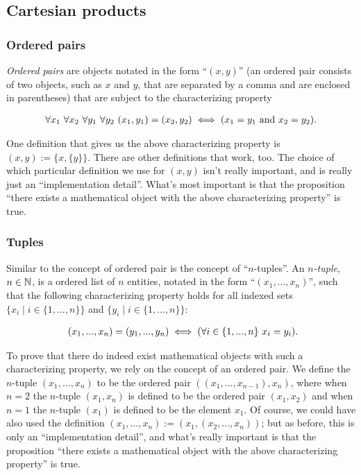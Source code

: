 \subsection*{Cartesian products}

\subsubsection*{Ordered pairs}

\textit{Ordered pairs} are objects notated in the form ``$(x, y)$'' (an ordered pair consists of two objects, such as $x$ and $y$, that are separated by a comma and are enclosed in parentheses) that are subject to the characterizing property

\begin{align*}
    \forall x_1 \text{ } \forall x_2 \text{ } \forall y_1 \text{ } \forall y_2 \text{ } (x_1, y_1) = (x_2, y_2) \iff (x_1 = y_1 \text{ and } x_2 = y_2).
\end{align*}

One definition that gives us the above characterizing property is $(x, y) := \{x, \{y\}\}$. There are other definitions that work, too. The choice of which particular definition we use for $(x, y)$ isn't really important, and is really just an ``implementation detail''. What's most important is that the proposition ``there exists a mathematical object with the above characterizing property'' is true.

\subsubsection*{Tuples}

Similar to the concept of ordered pair is the concept of ``$n$-tuples''. An \textit{$n$-tuple}, $n \in \mathbb{N}$, is a ordered list of $n$ entities, notated in the form ``$(x_1, ..., x_n)$'', such that the following characterizing property holds for all indexed sets $\{x_i \mid i \in \{1, ..., n\}\}$ and $\{y_i \mid i \in \{1, ..., n\}\}$:

\begin{align*}
     \text{ } (x_1, ..., x_n) = (y_1, ..., y_n) \iff (\forall i \in \{1, ..., n\} \text{ } x_i = y_i).
\end{align*}

To prove that there do indeed exist mathematical objects with such a characterizing property, we rely on the concept of an ordered pair. We define the $n$-tuple $(x_1, ..., x_n)$ to be the ordered pair $((x_1, ..., x_{n - 1}), x_n)$, where when $n = 2$ the $n$-tuple $(x_1, x_n)$ is defined to be the ordered pair $(x_1, x_2)$ and when $n = 1$ the $n$-tuple $(x_1)$ is defined to be the element $x_1$. Of course, we could have also used the definition $(x_1, ..., x_n) := (x_1, (x_2, ..., x_n))$; but as before, this is only an ``implementation detail'', and what's really important is that the proposition ``there exists a mathematical object with the above characterizing property'' is true.


